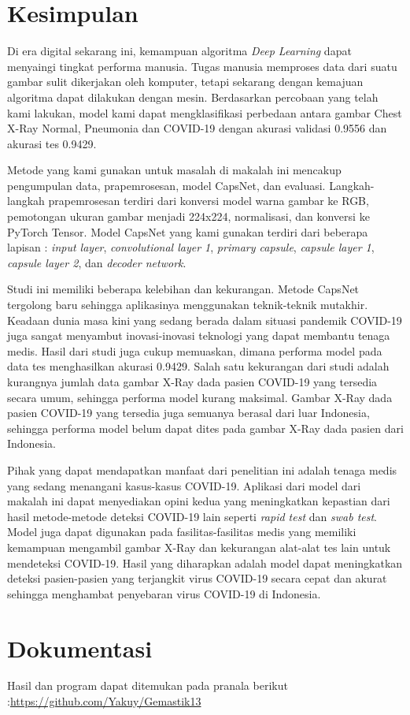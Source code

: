 \documentclass{article}
\begin{document}
   \section{Kesimpulan}
    Di era digital sekarang ini, kemampuan algoritma \textit{Deep Learning} dapat menyaingi tingkat performa manusia. Tugas manusia memproses data dari suatu gambar sulit dikerjakan oleh komputer, tetapi sekarang dengan kemajuan algoritma dapat dilakukan dengan mesin. Berdasarkan percobaan yang telah kami lakukan, model kami dapat mengklasifikasi perbedaan antara gambar Chest X-Ray Normal, Pneumonia dan COVID-19 dengan akurasi validasi 0.9556 dan akurasi tes 0.9429.
    \par
    Metode yang kami gunakan untuk masalah di makalah ini mencakup pengumpulan data, prapemrosesan, model CapsNet, dan evaluasi. Langkah-langkah prapemrosesan terdiri dari konversi model warna gambar ke RGB, pemotongan ukuran gambar menjadi 224x224, normalisasi, dan konversi ke PyTorch Tensor. Model CapsNet yang kami gunakan  terdiri dari beberapa lapisan : \textit{input layer}, \textit{convolutional layer 1}, \textit{primary capsule}, \textit{capsule layer 1}, \textit{capsule layer 2}, dan \textit{decoder network}.
    \par
    Studi ini memiliki beberapa kelebihan dan kekurangan. Metode CapsNet tergolong baru sehingga aplikasinya menggunakan teknik-teknik mutakhir. Keadaan dunia masa kini yang sedang berada dalam situasi pandemik COVID-19 juga sangat menyambut inovasi-inovasi teknologi yang dapat membantu tenaga medis. Hasil dari studi juga cukup memuaskan, dimana performa model pada data tes menghasilkan akurasi 0.9429. Salah satu kekurangan dari studi adalah kurangnya jumlah data gambar X-Ray dada pasien COVID-19 yang tersedia secara umum, sehingga performa model kurang maksimal. Gambar X-Ray dada pasien COVID-19 yang tersedia juga semuanya berasal dari luar Indonesia, sehingga performa model belum dapat dites pada gambar X-Ray dada pasien dari Indonesia. 
    \par
    Pihak yang dapat mendapatkan manfaat dari penelitian ini adalah tenaga medis yang sedang menangani kasus-kasus COVID-19. Aplikasi dari model dari makalah ini dapat menyediakan opini kedua yang meningkatkan kepastian dari hasil metode-metode deteksi COVID-19 lain seperti \textit{rapid test} dan \textit{swab test}. Model juga dapat digunakan pada fasilitas-fasilitas medis yang memiliki kemampuan mengambil gambar X-Ray dan kekurangan alat-alat tes lain untuk mendeteksi COVID-19. Hasil yang diharapkan adalah model dapat meningkatkan deteksi pasien-pasien yang terjangkit virus COVID-19 secara cepat dan akurat sehingga menghambat penyebaran virus COVID-19 di Indonesia.  
   
   \section{Dokumentasi}
   Hasil dan program dapat ditemukan pada pranala berikut :\url{https://github.com/Yakuy/Gemastik13}
   \newpage
   \printbibliography[title=Daftar Pustaka]
\end{document}
